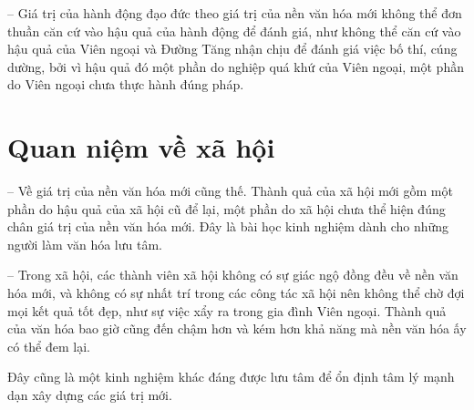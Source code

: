 -- Giá trị của hành động đạo đức theo giá trị của nền văn hóa mới không thể đơn thuần căn cứ vào hậu quả của hành động để đánh giá, như không thể căn cứ vào hậu quả của Viên ngoại và Đường Tăng nhận chịu để đánh giá việc bố thí, cúng dường, bởi vì hậu quả đó một phần do nghiệp quá khứ của Viên ngoại, một phần do Viên ngoại chưa thực hành đúng pháp.

\section{Quan niệm về xã hội} %
\label{sec:96_97_xa_hoi}

-- Về giá trị của nền văn hóa mới cũng thế. Thành quả của xã hội mới gồm một phần do hậu quả của xã hội cũ để lại, một phần do xã hội chưa thể hiện đúng chân giá trị của nền văn hóa mới. Đây là bài học kinh nghiệm dành cho những người làm văn hóa lưu tâm.

-- Trong xã hội, các thành viên xã hội không có sự giác ngộ đồng đều về nền văn hóa mới, và không có sự nhất trí trong các công tác xã hội nên không thể chờ đợi mọi kết quả tốt đẹp, như sự việc xẩy ra trong gia đình Viên ngoại. Thành quả của văn hóa bao giờ cũng đến chậm hơn và kém hơn khả năng mà nền văn hóa ấy có thể đem lại.

Đây cũng là một kinh nghiệm khác đáng được lưu tâm để ổn định tâm lý mạnh dạn xây dựng các giá trị mới.
